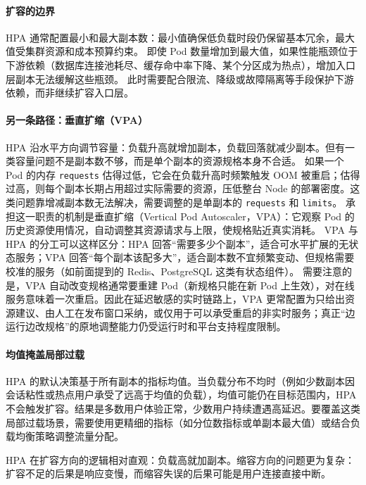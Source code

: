 \paragraph{扩容的边界}

HPA 通常配置最小和最大副本数：最小值确保低负载时段仍保留基本冗余，最大值受集群资源和成本预算约束。
即使 Pod 数量增加到最大值，如果性能瓶颈位于下游依赖（数据库连接池耗尽、缓存命中率下降、某个分区成为热点），增加入口层副本无法缓解这些瓶颈。
此时需要配合限流、降级或故障隔离等手段保护下游依赖，而非继续扩容入口层。

\paragraph{另一条路径：垂直扩缩（VPA）}

HPA 沿水平方向调节容量：负载升高就增加副本，负载回落就减少副本。但有一类容量问题不是副本数不够，而是单个副本的资源规格本身不合适。
如果一个 Pod 的内存 \texttt{requests} 估得过低，它会在负载升高时频繁触发 OOM 被重启；估得过高，则每个副本长期占用超过实际需要的资源，压低整台 Node 的部署密度。这类问题靠增减副本数无法解决，需要调整的是单副本的 \texttt{requests} 和 \texttt{limits}。
承担这一职责的机制是垂直扩缩（Vertical Pod Autoscaler，VPA）：它观察 Pod 的历史资源使用情况，自动调整其资源请求与上限，使规格贴近真实消耗。
VPA 与 HPA 的分工可以这样区分：HPA 回答“需要多少个副本”，适合可水平扩展的无状态服务；VPA 回答“每个副本该配多大”，适合副本数不宜频繁变动、但规格需要校准的服务（如前面提到的 Redis、PostgreSQL 这类有状态组件）。
需要注意的是，VPA 自动改变规格通常要重建 Pod（新规格只能在新 Pod 上生效），对在线服务意味着一次重启。因此在延迟敏感的实时链路上，VPA 更常配置为只给出资源建议、由人工在发布窗口采纳，或仅用于可以承受重启的非实时服务；真正“边运行边改规格”的原地调整能力仍受运行时和平台支持程度限制。

\paragraph{均值掩盖局部过载}

HPA 的默认决策基于所有副本的指标均值。当负载分布不均时（例如少数副本因会话粘性或热点用户承受了远高于均值的负载），均值可能仍在目标范围内，HPA 不会触发扩容。结果是多数用户体验正常，少数用户持续遭遇高延迟。要覆盖这类局部过载场景，需要使用更精细的指标（如分位数指标或单副本最大值）或结合负载均衡策略调整流量分配。

HPA 在扩容方向的逻辑相对直观：负载高就加副本。缩容方向的问题更为复杂：扩容不足的后果是响应变慢，而缩容失误的后果可能是用户连接直接中断。

